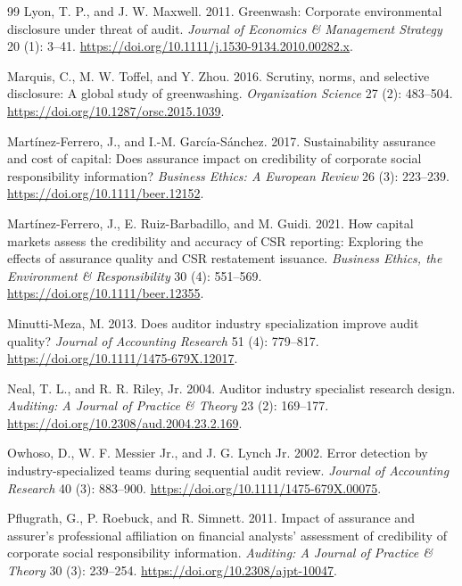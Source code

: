 \documentclass[11pt]{article}
\begin{document}
\begin{thebibliography}{99}
Lyon, T. P., and J. W. Maxwell. 2011.
Greenwash: Corporate environmental disclosure under threat of audit.
\textit{Journal of Economics \& Management Strategy} 20 (1): 3--41. \url{https://doi.org/10.1111/j.1530-9134.2010.00282.x}.

Marquis, C., M. W. Toffel, and Y. Zhou. 2016.
Scrutiny, norms, and selective disclosure: A global study of greenwashing.
\textit{Organization Science} 27 (2): 483--504. \url{https://doi.org/10.1287/orsc.2015.1039}.

Martínez-Ferrero, J., and I.-M. García-Sánchez. 2017.
Sustainability assurance and cost of capital: Does assurance impact on credibility of corporate social responsibility information?
\textit{Business Ethics: A European Review} 26 (3): 223--239. \url{https://doi.org/10.1111/beer.12152}.

Martínez-Ferrero, J., E. Ruiz-Barbadillo, and M. Guidi. 2021.
How capital markets assess the credibility and accuracy of CSR reporting: Exploring the effects of assurance quality and CSR restatement issuance.
\textit{Business Ethics, the Environment \& Responsibility} 30 (4): 551--569. \url{https://doi.org/10.1111/beer.12355}.

Minutti-Meza, M. 2013.
Does auditor industry specialization improve audit quality?
\textit{Journal of Accounting Research} 51 (4): 779--817. \url{https://doi.org/10.1111/1475-679X.12017}.

Neal, T. L., and R. R. Riley, Jr. 2004.
Auditor industry specialist research design.
\textit{Auditing: A Journal of Practice \& Theory} 23 (2): 169--177. \url{https://doi.org/10.2308/aud.2004.23.2.169}.

Owhoso, D., W. F. Messier Jr., and J. G. Lynch Jr. 2002.
Error detection by industry-specialized teams during sequential audit review.
\textit{Journal of Accounting Research} 40 (3): 883--900. \url{https://doi.org/10.1111/1475-679X.00075}.

Pflugrath, G., P. Roebuck, and R. Simnett. 2011.
Impact of assurance and assurer's professional affiliation on financial analysts' assessment of credibility of corporate social responsibility information.
\textit{Auditing: A Journal of Practice \& Theory} 30 (3): 239--254. \url{https://doi.org/10.2308/ajpt-10047}.


\end{thebibliography}
\end{document}
